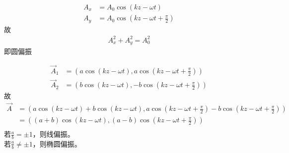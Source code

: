 \documentclass{phyasgn}
\begin{document}
\begin{sol}[3]
    \begin{align*}
        A_x&=A_0\cos\left(kz-\omega t\right)\\
        A_y&=A_0\cos\left(kz-\omega t+\frac{\pi}{2}\right)
    \end{align*}
    故
    \begin{align*}
        A_x^2+A_y^2=A_0^2
    \end{align*}
    即圆偏振
\end{sol}

\begin{sol}[4]
    \begin{align*}
        \vec{A}_1&=\left(a\cos\left(kz-\omega t\right),a\cos\left(kz-\omega t+\frac{\pi}{2}\right)\right)\\
        \vec{A}_2&=\left(b\cos\left(kz-\omega t\right),-b\cos\left(kz-\omega t+\frac{\pi}{2}\right)\right)
    \end{align*}
    故
    \begin{align*}
        \vec{A}&=\left(a\cos\left(kz-\omega t\right)+b\cos\left(kz-\omega t\right),a\cos\left(kz-\omega t+\frac{\pi}{2}\right)-b\cos\left(kz-\omega t+\frac{\pi}{2}\right)\right)\\
        &=\left((a+b)\cos\left(kz-\omega t\right),(a-b)\cos\left(kz-\omega t+\frac{\pi}{2}\right)\right)\\
    \end{align*}
    若$\frac{a}{b}=\pm 1$，则线偏振。\\
    若$\frac{a}{b}\neq\pm 1$，则椭圆偏振。
\end{sol}
\end{document}
